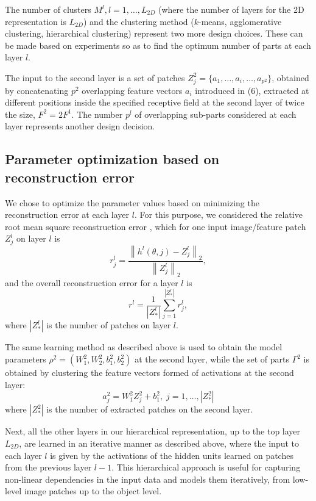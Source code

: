 \documentclass[runningheads]{llncs}
\begin{document}
The number of clusters $M^l, l=1,\ldots,L_{2D}$ (where the number of layers for the 2D representation is $L_{2D}$) and the clustering method ($k$-means, agglomerative clustering, hierarchical clustering) represent two more design choices. These can be made based on experiments so as to find the optimum number of parts at each layer $l$. 

The input to the second layer is a set of patches $Z_j^2=\{a_1,\ldots,a_i,\ldots,a_{p^2}\}$, obtained by concatenating  $p^2$ overlapping feature vectors $a_i$ introduced in (6), extracted at different positions inside the specified receptive field at the second layer of twice the size, $F^2=2F^1$. The number $p^l$ of overlapping sub-parts considered at each layer represents another design decision.

\subsection{Parameter optimization based on reconstruction error}

We chose to optimize the parameter values based on minimizing the reconstruction error at each layer $l$. For this purpose, we considered the relative root mean square reconstruction error \cite{Chai2014}, which for one input image/feature patch $Z_j^l$ on layer $l$ is
\begin{equation}
  r_j^l = \frac{\left\|h^l(\theta,j)-Z_j^l\right\|_2}{\left\|Z_j^l\right\|_2},
  \label{eqn:recon-error.patch}
\end{equation}
and the overall reconstruction error for a layer $l$ is
\begin{equation}
  r^l = \frac{1}{|Z_*^l|} \sum_{j=1}^{|Z_*^l|} r_j^l,
  \label{eq:r}
\end{equation}
where $|Z_*^l|$ is the number of patches on layer $l$.

The same learning method as described above is used to obtain the model parameters $\rho^2=(W_1^2,W_2^2,b_1^2,b_2^2)$ at the second layer, while the set of parts $\Gamma^{2}$ is obtained by clustering the feature vectors formed of activations at the second layer:
\begin{equation}
a_j^2=W_1^2Z_j^2+b_1^2, \;j=1,\ldots,|Z_*^2|
\end{equation}
where $|Z_*^2|$ is the number of extracted patches on the second layer.

Next, all the other layers in our hierarchical representation, up to the top layer $L_{2D}$, are learned in an iterative manner as described above, where the input to each layer $l$ is given by the activations of the hidden units learned on patches from the previous layer $l-1$. This hierarchical approach is useful for capturing non-linear dependencies in the input data and models them iteratively, from low-level image patches up to the object level.
\end{document}
